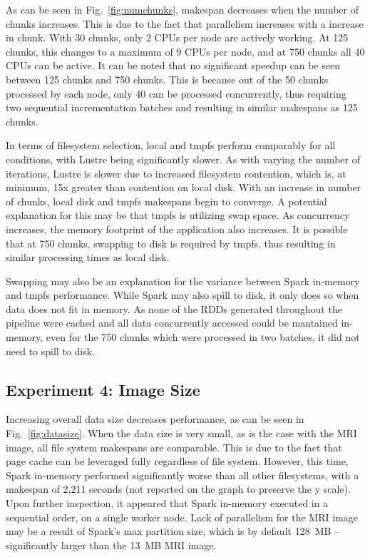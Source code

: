\documentclass{IEEEtran}
\begin{document}
As can be seen in Fig.~\ref{fig:numchunks}, makespan decreases when the number 
of chunks increases. This is due to the fact that parallelism increases with a increase in chunk. With 
30 chunks, only 2 CPUs per node are actively working. At 125 chunks, this 
changes to a maximum of 9 CPUs per node, and at 750 chunks all 40 CPUs can be 
active. It can be noted that no significant speedup can be seen between 125 
chunks and 750 chunks. This is because out of the 50 chunks processed by each 
node, only 40 can be processed concurrently, thus requiring two sequential 
incrementation batches and resulting in similar makespans as 125 
chunks.

In terms of filesystem selection, local and tmpfs perform comparably for all 
conditions, with Lustre being significantly slower. As with varying the number 
of iterations, Lustre is slower due to increased filesystem contention, which 
is, at minimum, 15x greater than contention on local disk. With an increase in 
number of chunks, local disk and tmpfs makespans begin to converge. A potential 
explanation for this may be that tmpfs is utilizing swap space. As concurrency 
increases, the memory footprint of the application also increases. It is 
possible that at 750 chunks, swapping to disk is required by tmpfs, thus 
resulting in similar processing times as local disk.

Swapping may also be an explanation for the variance between Spark in-memory 
and tmpfs performance. While Spark may also spill to disk, it only does so when
data does not fit in memory. As none of the RDDs generated throughout the 
pipeline were cached and all data concurrently accessed could be mantained 
in-memory, even for the 750 chunks which were processed in two batches, it did 
not need to spill to disk.

\subsection{Experiment 4: Image Size}

Increasing overall data size decreases performance, as can be seen in 
Fig.~\ref{fig:datasize}. When the data size is very small, as is the case 
with the MRI image, all file system makespans are comparable. This is due to the 
fact that page cache can be leveraged fully regardless of file system. However, 
this time, Spark in-memory performed significantly worse than all other 
filesystems, with a makespan of 2,211 seconds (not reported on the graph to preserve the y scale). Upon further inspection, it appeared that Spark in-memory executed
in a sequential order, on a single worker node. Lack of parallelism for the MRI 
image may be a result of Spark's max partition size, which is by default 128~MB
-- significantly larger than the 13~MB MRI image. 
\end{document}
